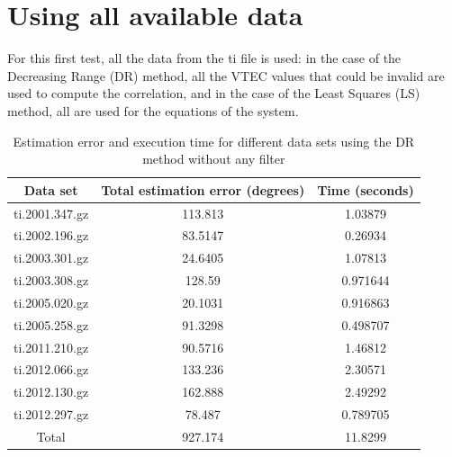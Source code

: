 \section{Using all available data}

For this first test, all the data from the ti file is used: in the case of the Decreasing Range (DR) method, all the VTEC values that could be invalid are used to compute the correlation, and in the case of the Least Squares (LS) method, all are used for the equations of the system.

\begin{table}[h!]
	\centering
	\def\arraystretch{1.2}
	\begin{tabular}{|c c c|} 
		\hline
		Data set & Total estimation error (degrees) & Time (seconds) \\ [0.5ex] 
		\hline\hline
		ti.2001.347.gz & 113.813 & 1.03879 \\
		\hline
		ti.2002.196.gz & 83.5147 & 0.26934 \\
		\hline
		ti.2003.301.gz & 24.6405 & 1.07813 \\
		\hline
		ti.2003.308.gz & 128.59 & 0.971644 \\
		\hline
		ti.2005.020.gz & 20.1031 & 0.916863 \\
		\hline
		ti.2005.258.gz & 91.3298 & 0.498707 \\
		\hline
		ti.2011.210.gz & 90.5716 & 1.46812 \\
		\hline
		ti.2012.066.gz & 133.236 & 2.30571 \\
		\hline
		ti.2012.130.gz & 162.888 & 2.49292 \\
		\hline
		ti.2012.297.gz & 78.487 & 0.789705 \\
		\hline\hline
		Total & 927.174 & 11.8299 \\
		\hline
	\end{tabular}
	\caption{Estimation error and execution time for different data sets using the DR method without any filter}
\end{table}


